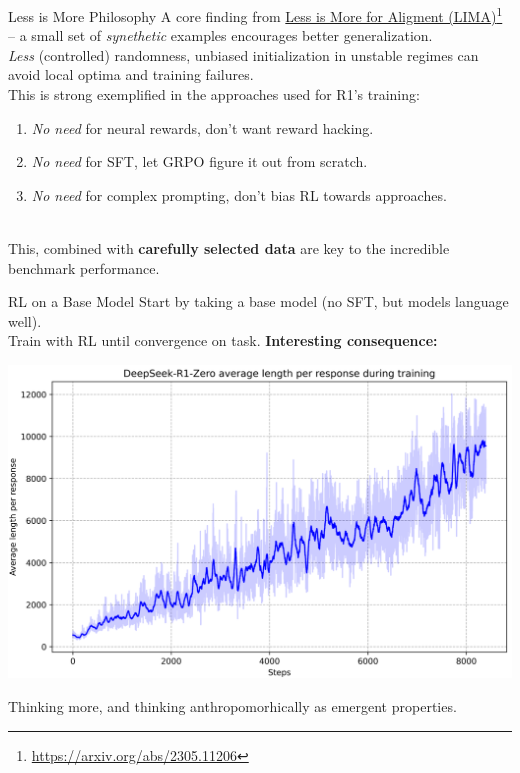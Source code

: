 \documentclass{beamer}
\begin{document}
\begin{frame}{Less is More Philosophy}
	A core finding from \underline{Less is More for Aligment (LIMA)}\footnote{\url{https://arxiv.org/abs/2305.11206}} -- a small set of \textit{synethetic} examples encourages better generalization. \pause \newline \\

	\textit{Less} (controlled) randomness, unbiased initialization in unstable regimes can avoid local optima and training failures. \pause \newline \\

	This is strong exemplified in the approaches used for R1's training: \pause
	\begin{enumerate}[label=\arabic*.]
		\item \textit{No need} for neural rewards, don't want reward hacking. \pause \\
		\item \textit{No need} for SFT, let GRPO figure it out from scratch. \pause \\
		\item \textit{No need} for complex prompting, don't bias RL towards approaches. \pause \\
	\end{enumerate}
	~ \\
	This, combined with \textbf{carefully selected data} are key to the incredible benchmark performance.
\end{frame}

\begin{frame}{RL on a Base Model}
	Start by taking a base model (no SFT, but models language well). \pause \newline \\

	Train with RL until convergence on task. \pause \textbf{Interesting consequence:}
	\begin{center}
		\includegraphics[width=.7\textwidth]{img/resp_len.png}
	\end{center} \pause
	\vspace{-1em}
	Thinking more, and thinking anthropomorhically as emergent properties.
\end{frame}
\end{document}
